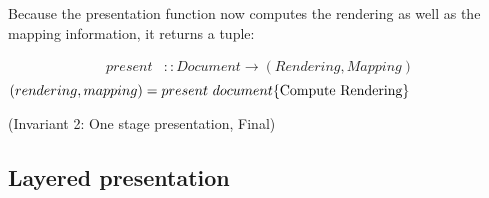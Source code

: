 Because the presentation function now computes the rendering as well as the mapping information, it returns a tuple:\begin{small}\begin{align*} %
present & :: Document \rightarrow (Rendering, Mapping) \\
\end{align*}
\begin{math}
(rendering, mapping) = present~document
\hfill \text{\{Compute Rendering\}}
\end{math}\end{small}

{\centering (Invariant 2: One stage presentation, Final)\\}\vspace{1em}
\subsection{Layered presentation}


